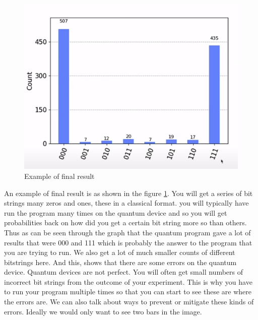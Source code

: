 \documentclass[12pt, oneside]{book}
\theoremstyle{definition}
\theoremstyle{definition}
\theoremstyle{remark}
\begin{document}
\begin{figure}
    \centering
    \includegraphics[width=0.75\linewidth]{../images/results_example.png}
    \caption{Example of final result}
    \label{fig:results_example}
\end{figure}
An example of final result is as shown in the figure \ref{fig:results_example}. You will get a series of bit strings many zeros and ones, these in a classical format. you will typically have run the program many times on the quantum device and so you will get probabilities back on how did you get a certain bit string more so than others. Thus as can be seen through the graph that the quantum program gave a lot of results that were 000 and 111 which is probably the answer to the program that you are trying to run. We also get a lot of much smaller counts of different bitstrings here. And this, shows that there are some errors on the quantum device. Quantum devices are not perfect. You will often get small numbers of incorrect bit strings from the outcome of your experiment. This is why you have to run your program multiple times so that you can start to see these are where the errors are. We can also talk about ways to prevent or mitigate these kinds of errors. Ideally we would only want to see two bars in the image.
\end{document}

